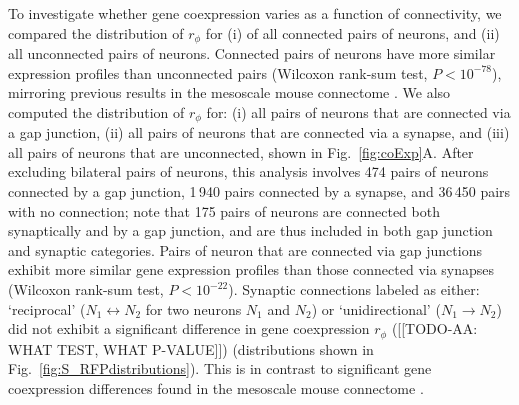 \documentclass[10pt,letterpaper]{article}
\begin{document}
To investigate whether gene coexpression varies as a function of connectivity, we compared the distribution of $r_\phi$ for (i) of all connected pairs of neurons, and (ii) all unconnected pairs of neurons.
Connected pairs of neurons have more similar expression profiles than unconnected pairs (Wilcoxon rank-sum test, $P < 10^{-78}$), mirroring previous results in the mesoscale mouse connectome \cite{Fulcher:2016ck}.
We also computed the distribution of $r_\phi$ for:
(i) all pairs of neurons that are connected via a gap junction,
(ii) all pairs of neurons that are connected via a synapse, and
(iii) all pairs of neurons that are unconnected, shown in Fig.~\ref{fig:coExp}A.
After excluding bilateral pairs of neurons, this analysis involves 474 pairs of neurons connected by a gap junction, 1\,940 pairs connected by a synapse, and 36\,450 pairs with no connection; note that 175 pairs of neurons are connected both synaptically and by a gap junction, and are thus included in both gap junction and synaptic categories.
Pairs of neuron that are connected via gap junctions exhibit more similar gene expression profiles than those connected via synapses (Wilcoxon rank-sum test, $P < 10^{-22}$).
Synaptic connections labeled as either:
`reciprocal' ($N_1 \leftrightarrow N_2$ for two neurons $N_1$ and $N_2$) or
`unidirectional' ($N_1 \rightarrow N_2$) did not exhibit a significant difference in gene coexpression $r_\phi$ ([[TODO-AA: WHAT TEST, WHAT P-VALUE]]) (distributions shown in Fig.~\ref{fig:S_RFPdistributions}).
This is in contrast to significant gene coexpression differences found in the mesoscale mouse connectome \cite{Fulcher:2016ck}.
\end{document}
